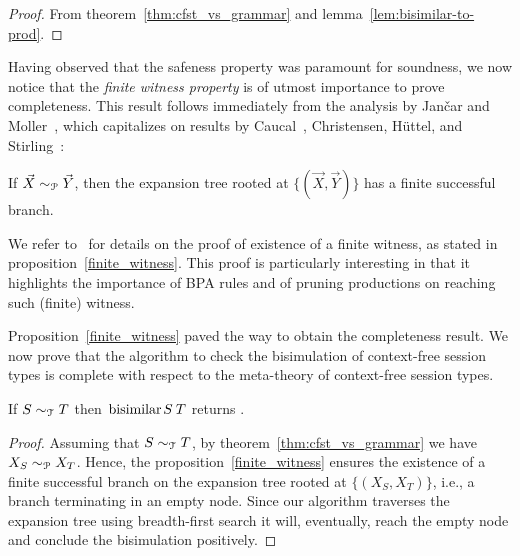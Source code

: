 \begin{proof}
  From theorem~\ref{thm:cfst_vs_grammar} and
  lemma~\ref{lem:bisimilar-to-prod}.
\end{proof}

Having observed that the safeness property was paramount for
soundness, we now notice that the \emph{finite witness property} is of
utmost importance to prove completeness. This result follows
immediately from the analysis by Jan{\v{c}}ar and
Moller~\cite{janvcar1999techniques}, which capitalizes on results by
Caucal~\cite{caucal1986decidabilite}, Christensen, H{\"{u}}ttel, and
Stirling~\cite{DBLP:journals/iandc/ChristensenHS95}:

\begin{proposition} 
\label{finite_witness}
	If $\vec X \sim_\mathcal P \vec Y$, then the expansion tree rooted at
	$\{(\vec X, \vec Y)\}$ has a finite successful branch.
\end{proposition}

We refer to~\cite{DBLP:journals/iandc/ChristensenHS95, caucal1986decidabilite}
for details on the proof of existence of a finite witness, as stated in 
proposition~\ref{finite_witness}. This proof is particularly interesting in that 
it highlights the importance of BPA rules and of pruning productions
on reaching such (finite) witness.

Proposition~\ref{finite_witness} paved the way to obtain the completeness result. 
We now prove that the algorithm to check the bisimulation of context-free session 
types is complete with respect to the meta-theory of context-free session
types.

\begin{theorem}
  If $S \sim_\mathcal T T$ then $\bisimf S T$ returns
  .
\end{theorem}

\begin{proof}
  Assuming that $S \sim_\mathcal T T$, by theorem~\ref{thm:cfst_vs_grammar}
  we have $X_{S} \sim_\mathcal P X_{T}$.  Hence, the proposition~\ref{finite_witness}
  ensures the existence of a finite successful branch on the
  expansion tree rooted at $\{(X_{S},X_{T})\}$, i.e., a branch
  terminating in an empty node.  Since our algorithm traverses the
  expansion tree using breadth-first search it will, eventually, reach
  the empty node and conclude the bisimulation positively.
\end{proof}

